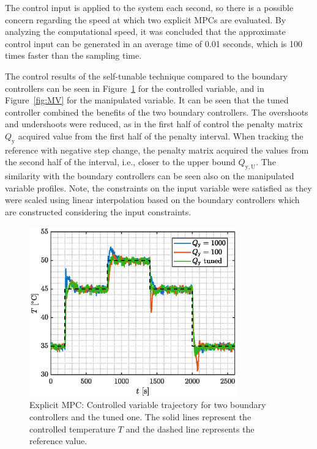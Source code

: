 \documentclass[preprint,12pt]{elsarticle}
\begin{document}
The control input is applied to the system each second, so there is a possible concern regarding the speed at which two explicit MPCs are evaluated. By analyzing the computational speed, it was concluded that the approximate control input can be generated in an average time of 0.01 seconds, which is 100 times faster than the sampling time.

The control results of the self-tunable technique compared to the boundary controllers can be seen in Figure~\ref{fig:CV} for the controlled variable, and in Figure~\ref{fig:MV} for the manipulated variable. It can be seen that the tuned controller combined the benefits of the two boundary controllers. The overshoots and undershoots were reduced, as in the first half of control the penalty matrix $Q_\mathrm{y}$ acquired value from the first half of the penalty interval. When tracking the reference with negative step change, the penalty matrix acquired the values from the second half of the interval, i.e., closer to the upper bound $Q_\mathrm{y, U}$. 
The similarity with the boundary controllers can be seen also on the manipulated variable profiles. Note, the constraints on the input variable were satisfied as they were scaled using linear interpolation based on the boundary controllers which are constructed considering the input constraints. 

\begin{figure}
	\begin{center}
		\includegraphics[width=0.8\textwidth]{images/CV}
		\caption{Explicit MPC: Controlled variable trajectory for two boundary controllers and the tuned one. The solid lines represent the controlled temperature $T$ and the dashed line represents the reference value.}
		\label{fig:CV}
	\end{center}
\end{figure}
\end{document}
